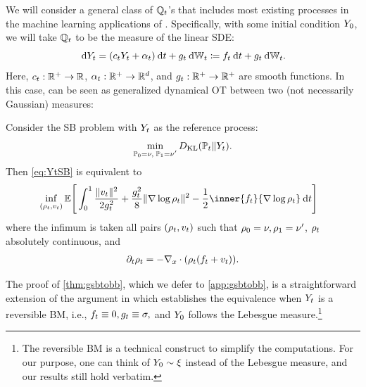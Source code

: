 We will consider a general class of $\refpro$'s that includes most existing processes in the machine learning applications of . Specifically, with some initial condition $\refsde[0]$, we will take $\refpro$ to be the measure of the linear \acrfull{SDE}:
\begin{equation}
\label{eq:linearsde}
\drefsde = \parens*{\drift \refsde  + \shift }\dd t + \volat \dWiener[\ctime] \defeq \driftf\dt + \volat \dWiener[\ctime].
\end{equation}
Here, $\drift: \R^+ \to \R$, $\shift : \R^+ \to \R^\vdim$, and $\volat: \R^+ \to \R^+$ are smooth functions. In this case,  can be seen as generalized dynamical \acrshort{OT} between two (not necessarily Gaussian) measures:
\begin{theorem}
\label{thm:gsbtobb}
Consider the \acrlong{SB} problem with $\refsde$ as the reference process: 
\begin{equation}
\label{eq:YtSB}
\min_{ \substack{ \Pinit = \nu, \; \Pend = \nu'} } \KL(\Pmargin \|\refsde).%
\end{equation}
Then \eqref{eq:YtSB} is equivalent to
\begin{align}
\label{eq:dynamicGSB}
&\inf_{(\measure,\vect)} \mathbb{E}\Bigg[\int_0^\horizon  \frac{\norm{\vect}^2}{2\volatsq[\ctime]} + \frac{\volatsq[\ctime]}{8} \norm{\nabla \log \measure}^2  - \frac{1}{2} \inner{\driftf}{\nabla \log\measure} \dt\Bigg]
\end{align}where the infimum is taken all pairs $(\measure,\vect)$ such that $\measure[0] = \nu, \measure[\horizon] = \nu'$, $\measure$ absolutely continuous, and
\begin{align}
\label{eq:Coneq2}
\partial_t \measure = -\Div \parens*{  \measure\parens*{ \driftf + \vect}  }.
\end{align}
\end{theorem}
The proof of \cref{thm:gsbtobb}, which we defer to \cref{app:gsbtobb}, is a straightforward extension of the argument in \citep{leonard2013survey, chen2016relation, gentil2017analogy} which establishes the equivalence when $\refsde$ is a reversible \acrlong{BM}, i.e., $\driftf \equiv0, \volat[\ctime] \equiv \sigma,$ and $\refsde[0]$ follows the Lebesgue measure.\footnote{The reversible \acrlong{BM} is a technical construct to simplify the computations. For our purpose, one can think of $\refsde[0]\sim \xi$ instead of the Lebesgue measure, and our results still hold verbatim.}  


